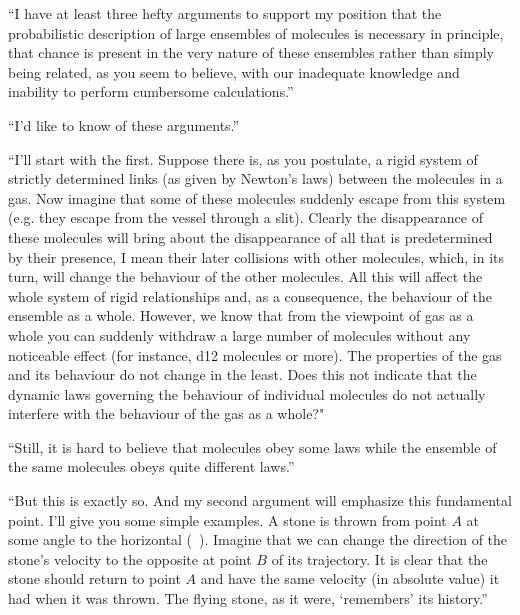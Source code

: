 \begin{dialogue}
\athr ``I have at least three hefty arguments to support my position that the probabilistic description of large ensembles of molecules is necessary in principle, that chance is present in the very nature of these ensembles rather than simply being related, as you seem to believe, with our inadequate knowledge and inability to perform cumbersome calculations.''

\prtnr ``I'd like to know of these arguments.''

\athr ``I'll start with the first. Suppose there is, as you postulate,
a rigid system of strictly determined links (as given by Newton's laws) between the molecules in a gas. Now imagine that some of these molecules suddenly escape from this system (e.g. they escape from the vessel through a slit). Clearly the disappearance of these molecules will bring about the disappearance of all that is predetermined by their presence, I mean their later collisions with other molecules, which, in its turn, will change the behaviour of the other molecules. All this will affect the whole system of rigid relationships and, as a consequence, the behaviour of the ensemble as a whole. However, we know that from the viewpoint of gas as a whole you can suddenly withdraw a large number of molecules without any noticeable effect (for instance, \num{d12} molecules or more). The properties of the gas and its behaviour do not change in the least. Does this not indicate that the dynamic laws governing the behaviour of individual molecules do not actually interfere with the behaviour of the gas as a whole?"

\prtnr ``Still, it is hard to believe that molecules obey some laws while the ensemble of the same molecules obeys quite different laws.''




\athr ``But this is exactly so. And my second argument will emphasize this fundamental point. I'll give you some simple examples. A stone is thrown from point $A$ at some angle to the horizontal (~). Imagine that we can change the direction of the stone's velocity to the opposite at point $B$ of its trajectory. It is clear that the stone should return to point $A$ and have the same velocity (in absolute value) it had when it was thrown. The flying stone, as it were, `remembers' its history.''


\end{dialogue}

